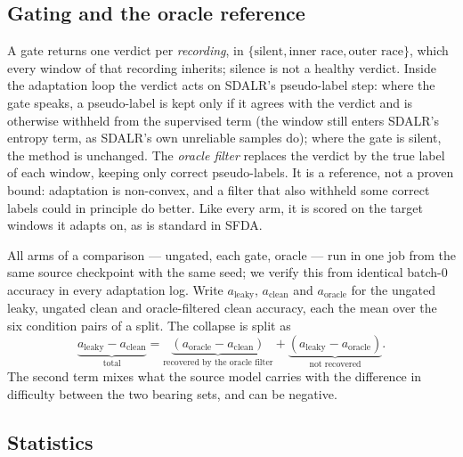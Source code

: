 \subsection{Gating and the oracle reference}

A gate returns one verdict per \emph{recording}, in $\{\text{silent},\text{inner race},\text{outer race}\}$, which every
window of that recording inherits; silence is not a healthy verdict. Inside the adaptation loop the verdict acts on SDALR's
pseudo-label step: where the gate speaks, a pseudo-label is kept only if it agrees with the verdict and is otherwise
withheld from the supervised term (the window still enters SDALR's entropy term, as SDALR's own unreliable samples do);
where the gate is silent, the method is unchanged. The \emph{oracle filter} replaces the verdict by the true label of each
window, keeping only correct pseudo-labels. It is a reference, not a proven bound: adaptation is non-convex, and a filter
that also withheld some correct labels could in principle do better. Like every arm, it is scored on the target windows it
adapts on, as is standard in SFDA.

All arms of a comparison --- ungated, each gate, oracle --- run in one job from the same source checkpoint with the same
seed; we verify this from identical batch-0 accuracy in every adaptation log. Write $a_{\mathrm{leaky}}$,
$a_{\mathrm{clean}}$ and $a_{\mathrm{oracle}}$ for the ungated leaky, ungated clean and oracle-filtered clean accuracy, each
the mean over the six condition pairs of a split. The collapse is split as
\begin{equation}
\underbrace{a_{\mathrm{leaky}}-a_{\mathrm{clean}}}_{\text{total}}
=\underbrace{\left(a_{\mathrm{oracle}}-a_{\mathrm{clean}}\right)}_{\text{recovered by the oracle filter}}
+\underbrace{\left(a_{\mathrm{leaky}}-a_{\mathrm{oracle}}\right)}_{\text{not recovered}}.
\label{eq:decomp}
\end{equation}
The second term mixes what the source model carries with the difference in difficulty between the two bearing sets, and
can be negative.

\subsection{Statistics}

